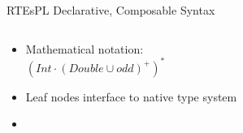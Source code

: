\begin{frame}[t]{RTEs}{PL Declarative, Composable Syntax}
  \begin{columns}
    \begin{column}{0.55\textwidth}
  \begin{itemize}
  \item Mathematical notation:\\
  \quad\textcolor{greeny}{$(Int \cdot (Double \cup odd)^+)^*$}

  \item Leaf nodes interface to native type system

  \item {}%
  \end{itemize}
    \end{column}%
    \begin{column}{0.45\textwidth}
      \scalebox{0.7}{}
    \end{column}%
  \end{columns}%
\end{frame}


\newsavebox\exampleAbox
\begin{lrbox}{\exampleAbox}
  \begin{minipage}{12cm}
    
  \end{minipage}
\end{lrbox}



\newsavebox\exampleAbbox
\begin{lrbox}{\exampleAbbox}
  \begin{minipage}{12cm}
    
  \end{minipage}
\end{lrbox}



\newsavebox\exampleAcbox
\begin{lrbox}{\exampleAcbox}
  \begin{minipage}{12cm}
    
  \end{minipage}
\end{lrbox}



\newsavebox\exampleAdbox
\begin{lrbox}{\exampleAdbox}
  \begin{minipage}{12cm}
    
  \end{minipage}
\end{lrbox}




\newsavebox\extendedbox
\begin{lrbox}{\extendedbox}
  \begin{minipage}{12cm}
  
  \end{minipage}
\end{lrbox}

